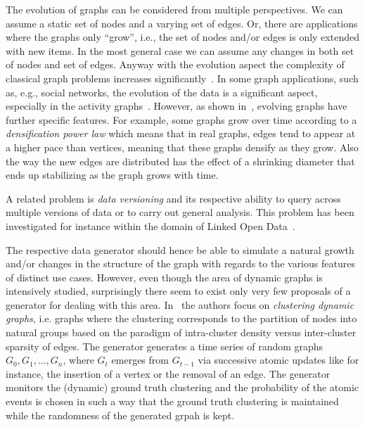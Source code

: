 The evolution of graphs can be considered from multiple perspectives. We can assume a static set of nodes and a varying set of edges.  Or, there are applications where the graphs only ``grow'', i.e., the set of nodes and/or edges is only extended with new items. In the most general case we can assume any changes in both set of nodes and set of edges. Anyway with the evolution aspect the complexity of classical graph problems increases significantly~\cite{Michail2015,Wu:2014:PPT:2732939.2732945}. In some graph applications, such as, e.g., social networks, the evolution of the
data is a significant aspect, especially in the activity graphs~\cite{doreian1997evolution,Kumar:2006:SEO:1150402.1150476,Hellmann2014583,wang2013,Kossinets88,Viswanath:2009:EUI:1592665.1592675}.
However, as shown in~\cite{Leskovec:2005:RMT:2101235.2101254,Leskovec:2005:GOT:1081870.1081893},
evolving graphs have further specific features. For example, some graphs grow
over time according to a \emph{densification power law} which means that in real
graphs, edges tend to appear at a higher pace than vertices, meaning that these
graphs densify as they grow. Also the way the new edges are distributed has the
effect of a shrinking diameter that ends up stabilizing as the graph grows with time.

A related problem is \emph{data versioning} and its respective ability to query across multiple versions of data or to carry out general analysis.
This problem has been investigated for instance within the domain of Linked
Open Data~\cite{DBLP:conf/semweb/Papakonstantinou16,DBLP:conf/esws/MeimarisP16,fernandez2015towards,fernandez2015bear}.


The respective data generator should hence be able to simulate a natural growth
and/or changes in the structure of the graph with regards to the various
features of distinct use cases. However,  even though the area of dynamic graphs
is intensively studied, surprisingly there seem to exist only very few proposals
of a generator for dealing with this area.
In~\cite{GoerkeKlugeSchumm2012_1000029825} the authors focus on \emph{clustering
dynamic graphs}, i.e. graphs where the clustering corresponds to the partition
of nodes into natural groups based on the paradigm of intra-cluster density
versus inter-cluster sparsity of edges. The generator generates a time series
of random graphs $G_0, G_1, ..., G_n$, where $G_t$ emerges from $G_{t-1}$ via
successive atomic updates like for instance, the insertion of a vertex or the removal of an
edge. The generator monitors the (dynamic) ground truth clustering and the probability
of the atomic events is chosen in such a way that the ground truth clustering is
maintained while the randomness of the generated grpah is kept.

